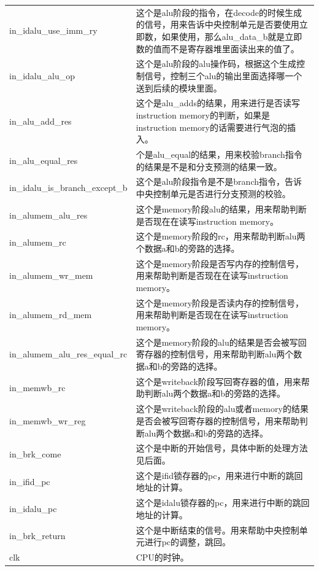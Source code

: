 \begin{center}
\begin{longtable}{p{}p{}}
            in\_idalu\_use\_imm\_ry & 这个是alu阶段的指令，在decode的时候生成的信号，用来告诉中央控制单元是否要使用立即数，如果使用，那么alu\_data\_b就是立即数的值而不是寄存器堆里面读出来的值了。\\
            in\_idalu\_alu\_op & 这个是alu阶段的alu操作码，根据这个生成控制信号，控制三个alu的输出里面选择哪一个送到后续的模块里面。\\
            in\_alu\_add\_res & 这个是alu\_adds的结果，用来进行是否读写instruction memory的判断，如果是instruction memory的话需要进行气泡的插入。\\
            in\_alu\_equal\_res & 个是alu\_equal的结果，用来校验branch指令的结果是不是和分支预测的结果一致。\\
            in\_idalu\_is\_branch\_except\_b & 这个是alu阶段指令是不是branch指令，告诉中央控制单元是否进行分支预测的校验。\\
            in\_alumem\_alu\_res & 这个是memory阶段alu的结果，用来帮助判断是否现在在读写instruction memory。\\ 
            in\_alumem\_rc & 这个是memory阶段的rc，用来帮助判断alu两个数据a和b的旁路的选择。\\
            in\_alumem\_wr\_mem & 这个是memory阶段是否写内存的控制信号，用来帮助判断是否现在在读写instruction memory。\\
            in\_alumem\_rd\_mem & 这个是memory阶段是否读内存的控制信号，用来帮助判断是否现在在读写instruction memory。\\
            in\_alumem\_alu\_res\_equal\_rc & 这个是memory阶段的alu的结果是否会被写回寄存器的控制信号，用来帮助判断alu两个数据a和b的旁路的选择。\\
            in\_memwb\_rc & 这个是writeback阶段写回寄存器的值，用来帮助判断alu两个数据a和b的旁路的选择。\\
            in\_memwb\_wr\_reg & 这个是writeback阶段的alu或者memory的结果是否会被写回寄存器的控制信号，用来帮助判断alu两个数据a和b的旁路的选择。\\
            in\_brk\_come & 这个是中断的开始信号，具体中断的处理方法见后面。\\
            in\_ifid\_pc & 这个是ifid锁存器的pc，用来进行中断的跳回地址的计算。\\
            in\_idalu\_pc & 这个是idalu锁存器的pc，用来进行中断的跳回地址的计算。\\
            in\_brk\_return & 这个是中断结束的信号。用来帮助中央控制单元进行pc的调整，跳回。\\
            clk & CPU的时钟。\\

\end{longtable}
\end{center}
